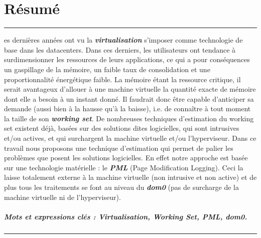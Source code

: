 %
%
%

\chapter*{Résumé}
{
\noindent\rule[3pt]{\textwidth}{1pt}
\vspace{.2cm}

es dernières années ont vu la \textbf{\emph{virtualisation}} s'imposer comme technologie de base dans les datacenters. Dans ces derniers, les utilisateurs ont tendance à surdimensionner les ressources de leurs applications, ce qui a pour conséquences un gaspillage de la mémoire, un faible taux de consolidation et une proportionnalité énergétique faible. La mémoire étant la ressource critique, il serait avantageux d’allouer à une machine virtuelle la quantité exacte de mémoire dont elle a besoin à un instant donné. Il faudrait donc être capable d’anticiper sa demande (aussi bien à la hausse qu’à la baisse), i.e. de connaître à tout moment la taille de son \textbf{\emph{working set}}. De nombreuses techniques d'estimation du working set existent déjà, basées sur des solutions dites logicielles, qui sont intrusives et/ou actives, et qui surchargent la machine virtuelle et/ou l'hyperviseur. Dans ce travail nous proposons une technique d'estimation qui permet de palier les problèmes que posent les solutions logicielles. En effet notre approche est basée sur une technologie matérielle : le \textbf{\emph{PML}} (Page Modification Logging). Ceci la laisse totalement externe à la machine virtuelle (non intrusive et non active) et de plus tous les traitements se font au niveau du \textbf{\emph{dom0}} (pas de surcharge de la machine virtuelle ni de l'hyperviseur). 

\paragraph{Mots et expressions clés : Virtualisation, Working Set, PML, dom0.}

\vspace{.2cm}
\noindent\rule[3pt]{\textwidth}{1pt}
}
\clearpage